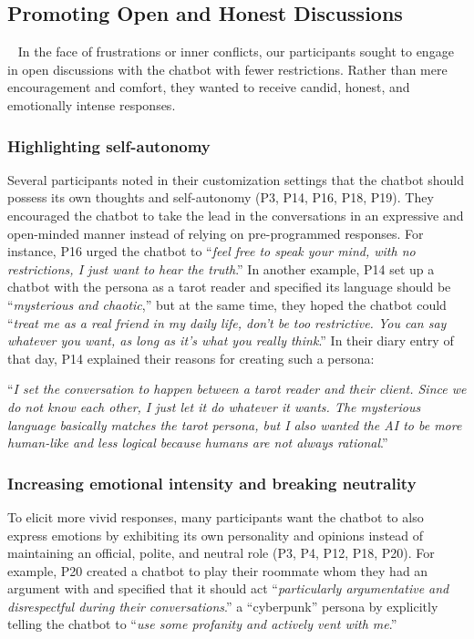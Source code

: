 \subsection{Promoting Open and Honest Discussions}~\label{open&engaging}
In the face of frustrations or inner conflicts, our participants sought to engage in open discussions with the chatbot with fewer restrictions. Rather than mere encouragement and comfort, they wanted to receive candid, honest, and emotionally intense responses.

\subsubsection{Highlighting self-autonomy}
Several participants noted in their customization settings that the chatbot should possess its own thoughts and self-autonomy (P3, P14, P16, P18, P19). They encouraged the chatbot to take the lead in the conversations in an expressive and open-minded manner instead of relying on pre-programmed responses. For instance, P16 urged the chatbot to ``\textit{feel free to speak your mind, with no restrictions, I just want to hear the truth}.'' 
In another example, P14 set up a chatbot with the persona as a tarot reader and specified its language should be ``\textit{mysterious and chaotic},'' but at the same time, they hoped the chatbot could ``\textit{treat me as a real friend in my daily life, don't be too restrictive. You can say whatever you want, as long as it's what you really think}.'' In their diary entry of that day, P14 explained their reasons for creating such a persona:

``\textit{I set the conversation to happen between a tarot reader and their client. Since we do not know each other, I just let it do whatever it wants. The mysterious language basically matches the tarot persona, but I also wanted the AI to be more human-like and less logical because humans are not always rational}.''


\subsubsection{Increasing emotional intensity and breaking neutrality}
To elicit more vivid responses, many participants want the chatbot to also express emotions by exhibiting its own personality and opinions instead of maintaining an official, polite, and neutral role (P3, P4, P12, P18, P20).
For example, P20 created a chatbot to play their roommate whom they had an argument with and specified that it should act ``\textit{particularly argumentative and disrespectful during their conversations}.'' 
 a ``cyberpunk'' persona by explicitly telling the chatbot to ``\textit{use some profanity and actively vent with me}.'' 

